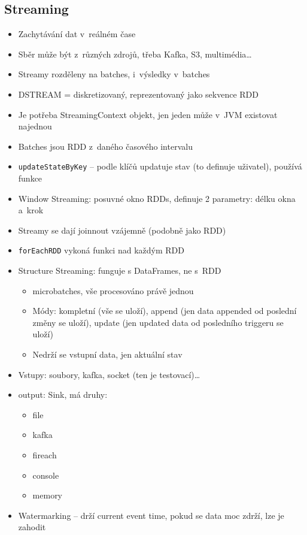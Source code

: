 \subsection{Streaming}
\begin{itemize}
    \item Zachytávání dat v~reálném čase
    \item Sběr může být z~různých zdrojů, třeba Kafka, S3, multimédia\dots
    \item Streamy rozděleny na batches, i~výsledky v~batches
    \item DSTREAM = diskretizovaný, reprezentovaný jako sekvence RDD
    \item Je potřeba StreamingContext objekt, jen jeden může v~JVM existovat najednou
    \item Batches jsou RDD z~daného časového intervalu
    \item \texttt{updateStateByKey} -- podle klíčů updatuje stav (to definuje uživatel), používá funkce
    \item Window Streaming: posuvné okno RDDs, definuje 2 parametry: délku okna a~krok
    \item Streamy se dají joinnout vzájemně (podobně jako RDD)
    \item \texttt{forEachRDD} vykoná funkci nad každým RDD
    \item Structure Streaming: funguje s DataFrames, ne s~RDD
    \begin{itemize}
        \item microbatches, vše procesováno právě jednou
        \item Módy: kompletní (vše se uloží), append (jen data appended od poslední změny se uloží), update (jen updated data od posledního triggeru se uloží)
        \item Nedrží se vstupní data, jen aktuální stav
    \end{itemize}
    \item Vstupy: soubory, kafka, socket (ten je testovací)\dots
    \item output: Sink, má druhy:
    \begin{itemize}
        \item file
        \item kafka
        \item fireach
        \item console
        \item memory
    \end{itemize}
    \item Watermarking -- drží current event time, pokud se data moc zdrží, lze je zahodit
\end{itemize}




